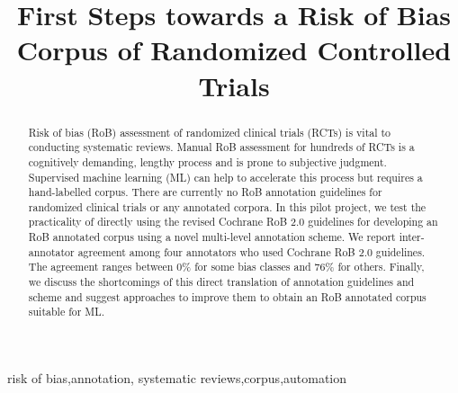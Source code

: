 \documentclass{IOS-Book-Article}
\def\hb{\hbox to 11.5 cm{}}
\begin{document}
\pagestyle{headings}
\def\thepage{}
\begin{frontmatter}              %


\title{First Steps towards a Risk of Bias Corpus of Randomized Controlled Trials}

\markboth{}{April 2022\hb}
\author[]{ } 


\begin{abstract}
Risk of bias (RoB) assessment of randomized clinical trials (RCTs) is vital to conducting systematic reviews. 
Manual RoB assessment for hundreds of RCTs is a cognitively demanding, lengthy process and is prone to subjective judgment. 
Supervised machine learning (ML) can help to accelerate this process but requires a hand-labelled corpus.
There are currently no RoB annotation guidelines for randomized clinical trials or any annotated corpora.
In this pilot project, we test the practicality of directly using the revised Cochrane RoB 2.0 guidelines for developing an RoB annotated corpus using a novel multi-level annotation scheme.
We report inter-annotator agreement among four annotators who used Cochrane RoB 2.0 guidelines.
The agreement ranges between 0\% for some bias classes and 76\% for others.
Finally, we discuss the shortcomings of this direct translation of annotation guidelines and scheme and suggest approaches to improve them to obtain an RoB annotated corpus suitable for ML.
\end{abstract}

\begin{keyword}
risk of bias\sep annotation\sep
systematic reviews\sep corpus\sep automation
\end{keyword}
\end{frontmatter}
\markboth{April 2022\hb}{April 2022\hb}
%
%
%
\end{document}
